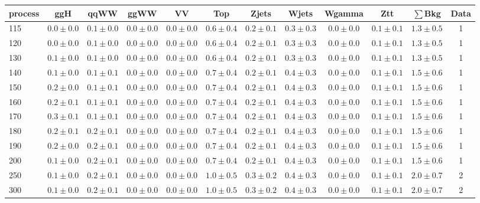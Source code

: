 \begin{table}[!hb]
{\footnotesize
 \begin{center}
 \begin{tabular}{l c c c c c c c c c c c }
 \hline
 process & ggH & qqWW & ggWW & VV & Top & Zjets & Wjets & Wgamma & Ztt & $\sum$Bkg & Data \\
 \hline
115 & $0.0\pm0.0$ & $0.1\pm0.0$ & $0.0\pm0.0$ & $0.0\pm0.0$ & $0.6\pm0.4$ & $0.2\pm0.1$ & $0.3\pm0.3$ & $0.0\pm0.0$ & $0.1\pm0.1$ & $1.3\pm0.5$ & 1 \\
120 & $0.0\pm0.0$ & $0.1\pm0.0$ & $0.0\pm0.0$ & $0.0\pm0.0$ & $0.6\pm0.4$ & $0.2\pm0.1$ & $0.3\pm0.3$ & $0.0\pm0.0$ & $0.1\pm0.1$ & $1.3\pm0.5$ & 1 \\
130 & $0.1\pm0.0$ & $0.1\pm0.0$ & $0.0\pm0.0$ & $0.0\pm0.0$ & $0.6\pm0.4$ & $0.2\pm0.1$ & $0.3\pm0.3$ & $0.0\pm0.0$ & $0.1\pm0.1$ & $1.3\pm0.5$ & 1 \\
140 & $0.1\pm0.0$ & $0.1\pm0.1$ & $0.0\pm0.0$ & $0.0\pm0.0$ & $0.7\pm0.4$ & $0.2\pm0.1$ & $0.4\pm0.3$ & $0.0\pm0.0$ & $0.1\pm0.1$ & $1.5\pm0.6$ & 1 \\
150 & $0.2\pm0.0$ & $0.1\pm0.1$ & $0.0\pm0.0$ & $0.0\pm0.0$ & $0.7\pm0.4$ & $0.2\pm0.1$ & $0.4\pm0.3$ & $0.0\pm0.0$ & $0.1\pm0.1$ & $1.5\pm0.6$ & 1 \\
160 & $0.2\pm0.1$ & $0.1\pm0.1$ & $0.0\pm0.0$ & $0.0\pm0.0$ & $0.7\pm0.4$ & $0.2\pm0.1$ & $0.4\pm0.3$ & $0.0\pm0.0$ & $0.1\pm0.1$ & $1.5\pm0.6$ & 1 \\
170 & $0.3\pm0.1$ & $0.1\pm0.1$ & $0.0\pm0.0$ & $0.0\pm0.0$ & $0.7\pm0.4$ & $0.2\pm0.1$ & $0.4\pm0.3$ & $0.0\pm0.0$ & $0.1\pm0.1$ & $1.5\pm0.6$ & 1 \\
180 & $0.2\pm0.1$ & $0.2\pm0.1$ & $0.0\pm0.0$ & $0.0\pm0.0$ & $0.7\pm0.4$ & $0.2\pm0.1$ & $0.4\pm0.3$ & $0.0\pm0.0$ & $0.1\pm0.1$ & $1.5\pm0.6$ & 1 \\
190 & $0.2\pm0.0$ & $0.2\pm0.1$ & $0.0\pm0.0$ & $0.0\pm0.0$ & $0.7\pm0.4$ & $0.2\pm0.1$ & $0.4\pm0.3$ & $0.0\pm0.0$ & $0.1\pm0.1$ & $1.5\pm0.6$ & 1 \\
200 & $0.1\pm0.0$ & $0.2\pm0.1$ & $0.0\pm0.0$ & $0.0\pm0.0$ & $0.7\pm0.4$ & $0.2\pm0.1$ & $0.4\pm0.3$ & $0.0\pm0.0$ & $0.1\pm0.1$ & $1.5\pm0.6$ & 1 \\
250 & $0.1\pm0.0$ & $0.2\pm0.1$ & $0.0\pm0.0$ & $0.0\pm0.0$ & $1.0\pm0.5$ & $0.3\pm0.2$ & $0.4\pm0.3$ & $0.0\pm0.0$ & $0.1\pm0.1$ & $2.0\pm0.7$ & 2 \\
300 & $0.1\pm0.0$ & $0.2\pm0.1$ & $0.0\pm0.0$ & $0.0\pm0.0$ & $1.0\pm0.5$ & $0.3\pm0.2$ & $0.4\pm0.3$ & $0.0\pm0.0$ & $0.1\pm0.1$ & $2.0\pm0.7$ & 2 \\

\end{tabular}
\end{center}}
\end{table}
